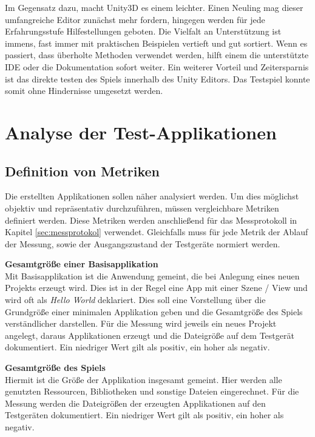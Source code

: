 \bigskip
Im Gegensatz dazu, macht Unity3D es einem leichter. Einen Neuling mag dieser umfangreiche Editor zunächst mehr fordern, hingegen werden für jede Erfahrungsstufe Hilfestellungen geboten. Die Vielfalt an Unterstützung ist immens, fast immer mit praktischen Beispielen vertieft und gut sortiert. Wenn es passiert, dass überholte Methoden verwendet werden, hilft einem die unterstützte IDE oder die Dokumentation sofort weiter. Ein weiterer Vorteil und Zeitersparnis ist das direkte testen des Spiels innerhalb des Unity Editors. Das Testspiel konnte somit ohne Hindernisse umgesetzt werden.


\chapter{Analyse der Test-Applikationen}

\section{Definition von Metriken}
Die erstellten Applikationen sollen näher analysiert werden. Um dies möglichst objektiv und repräsentativ durchzuführen, müssen vergleichbare Metriken definiert werden. Diese Metriken werden anschließend für das Messprotokoll in Kapitel \ref{sec:messprotokol} verwendet. Gleichfalls muss für jede Metrik der Ablauf der Messung, sowie der Ausgangszustand der Testgeräte normiert werden.

\bigskip
\textbf{Gesamtgröße einer Basisapplikation} \\
Mit Basisapplikation ist die Anwendung gemeint, die bei Anlegung eines neuen Projekts erzeugt wird. Dies ist in der Regel eine App mit einer Szene / View und wird oft als \emph{Hello World} deklariert. Dies soll eine Vorstellung über die Grundgröße einer minimalen Applikation geben und die Gesamtgröße des Spiels verständlicher darstellen. Für die Messung wird jeweils ein neues Projekt angelegt, daraus Applikationen erzeugt und die Dateigröße auf dem Testgerät dokumentiert. Ein niedriger Wert gilt als positiv, ein hoher als negativ.

\bigskip
\textbf{Gesamtgröße des Spiels} \\
Hiermit ist die Größe der Applikation insgesamt gemeint. Hier werden alle genutzten Ressourcen, Bibliotheken und sonstige Dateien eingerechnet. Für die Messung werden die Dateigrößen der erzeugten Applikationen auf den Testgeräten dokumentiert. Ein niedriger Wert gilt als positiv, ein hoher als negativ.

